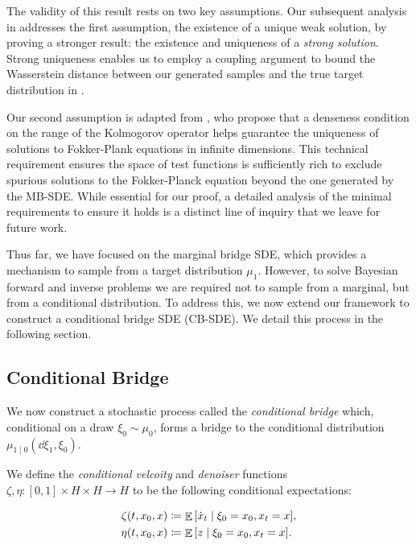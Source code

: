 The validity of this result rests on two key assumptions. Our subsequent analysis in  addresses the first assumption, the existence of a unique weak solution, by proving a stronger result: the existence and uniqueness of a \textit{strong solution}. Strong uniqueness enables us to employ a coupling argument to bound the Wasserstein distance between our generated samples and the true target distribution in . %

Our second assumption is adapted from \citet{bogachev2010uniquenesssolutionsfokkerplanckequations}, who propose that a denseness condition on the range of the Kolmogorov operator helps guarantee the uniqueness of solutions to Fokker-Plank equations in infinite dimensions. This technical requirement ensures the space of test functions is sufficiently rich to exclude spurious solutions to the Fokker-Planck equation beyond the one generated by the MB-SDE. While essential for our proof, a detailed analysis of the minimal requirements to ensure it holds is a distinct line of inquiry that we leave for future work.


Thus far, we have focused on the marginal bridge SDE, which provides a mechanism to sample from a target distribution \(\mu_{1}\). However,  to solve Bayesian forward and inverse problems we are required not to sample from a marginal, but from a conditional distribution. To address this, we now extend our framework to construct a conditional bridge SDE (CB-SDE). We detail this process in the following section.

\subsection{Conditional Bridge}\label{ssec:condbridge}
We now construct a stochastic process called the \textit{conditional bridge} which, conditional on a draw \(\xi_{0} \sim \mu_{0}\), forms a bridge to the conditional distribution \(\mu_{1 \mid 0}(\dd{\xi_{1}}, \xi_{0})\).

We define the \textit{conditional velcoity} and \textit{denoiser} functions \(\zeta, \eta: [0, 1] \times H \times H \to H\) to be the following conditional expectations:

\begin{align}
  \zeta(t, x_{0}, x) &\coloneqq \mathop{\mathbb{E}}\qty[\dot{x}_{t} \mid \xi_{0} = x_{0}, x_{t} = x],\label{eqn:condzetadef} \\
  \eta(t, x_{0}, x) &\coloneqq \mathop{\mathbb{E}}\qty[ z \mid \xi_{0} = x_{0}, x_{t} = x]. \label{eqn:condetadef}
\end{align}

